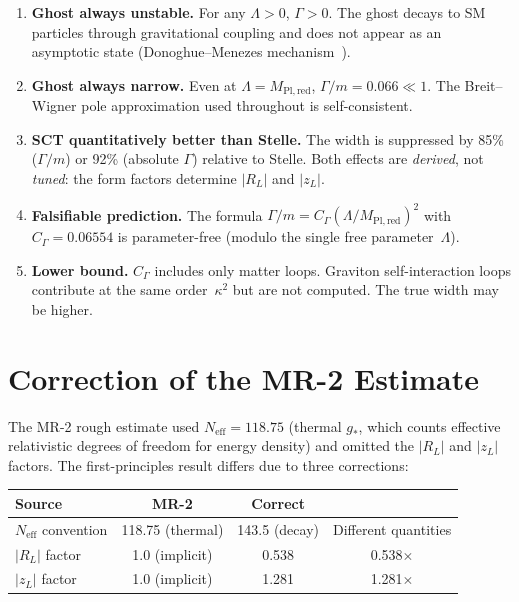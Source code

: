 \documentclass[11pt,a4paper]{article}
\newcommand{\MPlred}{M_{\mathrm{Pl,red}}}
\newcommand{\Neff}{N_{\mathrm{eff}}}
\begin{document}
\begin{enumerate}
  \item \textbf{Ghost always unstable.}
    For any $\Lambda > 0$, $\Gamma > 0$.  The ghost decays to SM
    particles through gravitational coupling and does not appear as an
    asymptotic state (Donoghue--Menezes mechanism~\cite{DM2019}).

  \item \textbf{Ghost always narrow.}
    Even at $\Lambda = \MPlred$, $\Gamma/m = 0.066 \ll 1$.  The
    Breit--Wigner pole approximation used throughout is self-consistent.

  \item \textbf{SCT quantitatively better than Stelle.}
    The width is suppressed by 85\% ($\Gamma/m$) or 92\% (absolute
    $\Gamma$) relative to Stelle.  Both effects are \emph{derived},
    not \emph{tuned}: the form factors determine $|R_L|$ and $|z_L|$.

  \item \textbf{Falsifiable prediction.}
    The formula $\Gamma/m = C_\Gamma(\Lambda/\MPlred)^2$ with
    $C_\Gamma = 0.06554$ is parameter-free (modulo the single free
    parameter~$\Lambda$).

  \item \textbf{Lower bound.}
    $C_\Gamma$ includes only matter loops.  Graviton self-interaction
    loops contribute at the same order~$\kappa^2$ but are not computed.
    The true width may be higher.
\end{enumerate}


\section{Correction of the MR-2 Estimate}
\label{sec:correction}

The MR-2 rough estimate used $\Neff = 118.75$ (thermal $g_*$, which
counts effective relativistic degrees of freedom for energy density)
and omitted the $|R_L|$ and $|z_L|$ factors.  The first-principles
result differs due to three corrections:

\begin{center}
\begin{tabular}{lccc}
\toprule
Source & MR-2 & Correct & \\
\midrule
$\Neff$ convention & 118.75 (thermal) & 143.5 (decay) &
  Different quantities \\
$|R_L|$ factor & 1.0 (implicit) & 0.538 & 0.538$\times$ \\
$|z_L|$ factor & 1.0 (implicit) & 1.281 & 1.281$\times$ \\
\bottomrule
\end{tabular}
\end{center}
\end{document}
